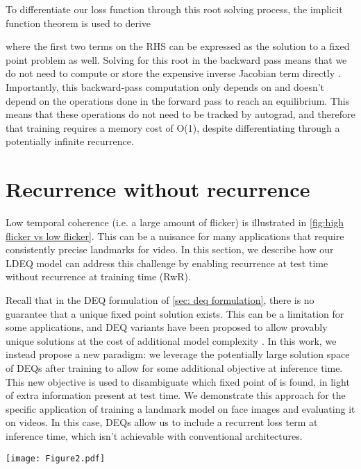 \documentclass[10pt,twocolumn,letterpaper]{article}
\begin{document}
To differentiate our loss function  through this root solving process, the implicit function theorem is used \cite{Bai2019DEQs} to derive

where the first two terms on the RHS can be expressed as the solution to a fixed point problem as well. Solving for this root in the backward pass means that we do not need to compute or store the expensive inverse Jacobian term  directly \cite{Bai2019DEQs, DeepImplicitLayerTutorial}. Importantly, this backward-pass computation only depends on  and doesn't depend on the operations done in the forward pass to reach an equilibrium. This means that these operations do not need to be tracked by autograd, and therefore that training requires a memory cost of O(1), despite differentiating through a potentially infinite recurrence.

\section{Recurrence without recurrence}

Low temporal coherence (i.e. a large amount of flicker) is illustrated in \cref{fig:high flicker vs low flicker}. This can be a nuisance for many applications that require consistently precise landmarks for video. In this section, we describe how our LDEQ model can address this challenge by enabling recurrence at test time without recurrence at training time (RwR).

Recall that in the DEQ formulation of \cref{sec: deq formulation}, there is no guarantee that a unique fixed point solution exists. This can be a limitation for some applications, and DEQ variants have been proposed to allow provably unique solutions at the cost of additional model complexity \cite{Winston2020MonotoneOperatorDEQs, Pabbaraju2021EstimatingLipConstantsOfMonDEQs}. In this work, we instead propose a new paradigm: we leverage the potentially large solution space of DEQs after training to allow for some additional objective at inference time. This new objective is used to disambiguate which fixed point of  is found, in light of extra information present at test time. We demonstrate this approach for the specific application of training a landmark model on face images and evaluating it on videos. In this case, DEQs allow us to include a recurrent loss term at inference time, which isn't achievable with conventional architectures.

\begin{figure*}[t!]
  \centering
   \texttt{[image: Figure2.pdf]}
   \caption{Model predictions (\textcolor{red}{}) and ground truth landmarks (\textcolor{green}{\textbullet}) for (a) a model with high temporal coherence and (b) a model with the same accuracy but exhibiting a worse temporal coherence, due to ambiguity at the chin. This causes flickering around the ground truth, as illustrated in the landmark trajectory (right). This flickering is common when video frames are evaluated individually, as opposed to recurrently.} \label{fig:high flicker vs low flicker}
\end{figure*}
\end{document}
